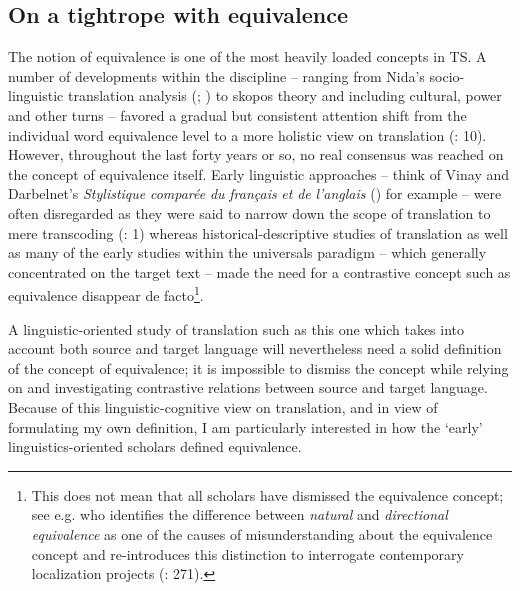 \subsection{\label{sec:2.2.4}  On a tightrope with equivalence}

The notion of equivalence is one of the most heavily loaded concepts in TS. A number of developments within the discipline – ranging from Nida’s socio-linguistic translation analysis (\citealt{nida_toward_1964}; \citealt{nida_theory_1969}) to skopos theory \citep{nord_translating_1997} and including cultural, power and other turns – favored a gradual but consistent attention shift from the individual word equivalence level to a more holistic view on translation (\citealt{munday_issues_2009}: 10). However, throughout the last forty years or so, no real consensus was reached on the concept of equivalence itself. Early linguistic approaches – think of Vinay and Darbelnet’s \textit{Stylistique} \textit{comparée} \textit{du} \textit{français} \textit{et} \textit{de} \textit{l’anglais} (\citealt{vinay_stylistique_1958}) for example – were often disregarded as they were said to narrow down the scope of translation to mere transcoding (\citealt{vandeweghe_introduction:_2007}: 1) whereas historical-descriptive studies of translation as well as many of the early studies within the universals paradigm – which generally concentrated on the target text – made the need for a contrastive concept such as equivalence disappear de facto\footnote{This does not mean that all scholars have dismissed the equivalence concept; see e.g. \citet{pym_natural_2007} who identifies the difference between \textit{natural} and \textit{directional} \textit{equivalence} as one of the causes of misunderstanding about the equivalence concept and re-introduces this distinction to interrogate contemporary localization projects (\citealt{pym_natural_2007}: 271).}.



A linguistic-oriented study of translation such as this one which takes into account both source and target language will nevertheless need a solid definition of the concept of equivalence; it is impossible to dismiss the concept while relying on and investigating contrastive relations between source and target language. Because of this linguistic-cognitive view on translation, and in view of formulating my own definition, I am particularly interested in how the ‘early’ linguistics-oriented scholars defined equivalence.



